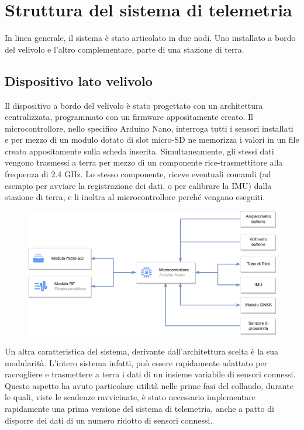 \documentclass[12pt]{article}
\begin{document}
\section*{Struttura del sistema di telemetria}
In linea generale, il sistema è stato articolato in due nodi. Uno installato a bordo del velivolo e l'altro complementare, parte di una stazione di terra.

\subsection*{Dispositivo lato velivolo}
Il dispositivo a bordo del velivolo è stato progettato con un architettura centralizzata, programmato con un firmware appositamente creato. Il microcontrollore, nello specifico Arduino Nano, interroga tutti i sensori installati e per mezzo di un modulo dotato di slot micro-SD ne memorizza i valori in un file creato appositamente sulla scheda inserita. Simultaneamente, gli stessi dati vengono trasmessi a terra per mezzo di un componente rice-trasmettitore alla frequenza di 2.4 GHz. Lo stesso componente, riceve eventuali comandi (ad esempio per avviare la registrazione dei dati, o per calibrare la IMU) dalla stazione di terra, e li inoltra al microcontrollore perché vengano eseguiti.

\begin{figure}[h]
	\centering
	\includegraphics[width=13cm]{img/RADAR-Arch}
\end{figure}

\noindent
Un altra caratteristica del sistema, derivante dall'architettura scelta è la sua modularità. L'intero sistema infatti, può essere rapidamente adattato per raccogliere e trasmettere a terra i dati di un insieme variabile di sensori connessi. Questo aspetto ha avuto particolare utilità nelle prime fasi del collaudo, durante le quali, viste le scadenze ravvicinate, è stato necessario implementare rapidamente una prima versione del sistema di telemetria, anche a patto di disporre dei dati di un numero ridotto di sensori connessi.
\end{document}
